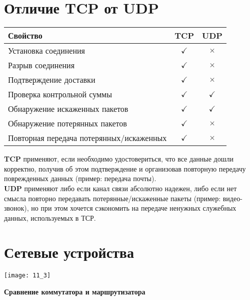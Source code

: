 \section{Отличие TCP от UDP}
\begin{table}[h]
\begin{tabular}{|l|c|c|}
\hline
Свойство & TCP & UDP \\
\hline
Установка соединения & $\checkmark$ & $\times$ \\
Разрыв соединения &  $\checkmark$ & $\times$ \\
Подтверждение доставки &  $\checkmark$ & $\times$ \\
Проверка контрольной суммы  & $\checkmark$ & $\checkmark$ \\
Обнаружение искаженных пакетов & $\checkmark$ & $\checkmark$ \\
Обнаружение потерянных пакетов & $\checkmark$ & $\times$ \\
Повторная передача потерянных/искаженных & $\checkmark$ & $\times$ \\
\hline
\end{tabular}
\end{table}
\textbf{TCP} применяют, если необходимо удостовериться, что все данные дошли корректно, получив об этом подтверждение и организовав повторную передачу поврежденных данных (пример: передача почты).
\\\textbf{UDP} применяют либо если канал связи абсолютно надежен, либо если нет смысла повторно передавать потерянные/искаженные пакеты (пример: видео-звонок), но при этом хочется сэкономить на передаче ненужных служебных данных, используемых в ТСР.
\section{Сетевые устройства}

\begin{minipage}{\textwidth}
\texttt{[image: 11\_3]}
\end{minipage}

\begin{center}
  \textbf{Сравнение коммутатора и маршрутизатора}
\end{center}

